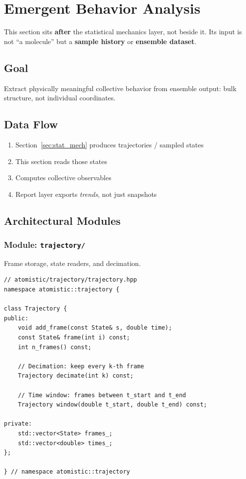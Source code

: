\documentclass[11pt]{article}
\begin{document}
\section{Emergent Behavior Analysis}
\label{sec:emergent}

This section sits \textbf{after} the statistical mechanics layer, not
beside it.  Its input is not ``a molecule'' but a \textbf{sample history}
or \textbf{ensemble dataset}.

\subsection{Goal}

Extract physically meaningful collective behavior from ensemble output:
bulk structure, not individual coordinates.

\subsection{Data Flow}

\begin{enumerate}
  \item Section~\ref{sec:stat_mech} produces trajectories / sampled states
  \item This section reads those states
  \item Computes collective observables
  \item Report layer exports \textit{trends}, not just snapshots
\end{enumerate}

\subsection{Architectural Modules}

\subsubsection{Module: \texttt{trajectory/}}

Frame storage, state readers, and decimation.

\begin{lstlisting}
// atomistic/trajectory/trajectory.hpp
namespace atomistic::trajectory {

class Trajectory {
public:
    void add_frame(const State& s, double time);
    const State& frame(int i) const;
    int n_frames() const;

    // Decimation: keep every k-th frame
    Trajectory decimate(int k) const;

    // Time window: frames between t_start and t_end
    Trajectory window(double t_start, double t_end) const;

private:
    std::vector<State> frames_;
    std::vector<double> times_;
};

} // namespace atomistic::trajectory
\end{lstlisting}
\end{document}
